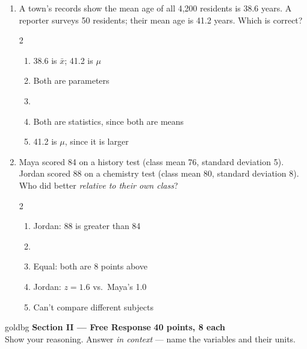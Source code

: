 \documentclass[12pt]{article}
\newenvironment{choices}
  {\begin{enumerate}[label=\textbf{(\Alph*)}, leftmargin=2.2em, itemsep=0pt, topsep=1pt]}
  {\end{enumerate}}
\newcommand{\letterroom}{\rule[-15pt]{0pt}{36pt}}
\begin{document}
\begin{enumerate}[leftmargin=1.9em, itemsep=0.03in]
  \boxguard[10]
  \item A town's records show the mean age of all 4,200 residents is 38.6 years. A reporter
        surveys 50 residents; their mean age is 41.2 years. Which is correct?
        \begin{multicols}{2}
        \begin{choices}
          \item 38.6 is $\bar x$; 41.2 is $\mu$
          \item Both are parameters
          \item {}
          \item Both are statistics, since both are means
          \item 41.2 is $\mu$, since it is larger
                \hfill{}\letterroom
        \end{choices}
        \end{multicols}

  \boxguard[11]
  \item Maya scored 84 on a history test (class mean 76, standard deviation 5). Jordan scored 88 on
        a chemistry test (class mean 80, standard deviation 8). Who did better \emph{relative to
        their own class}?\hfill{}\letterroom
        \begin{multicols}{2}
        \begin{choices}
          \item Jordan: 88 is greater than 84
          \item {}
          \item Equal: both are 8 points above
          \item Jordan: $z = 1.6$ vs.\ Maya's 1.0
          \item Can't compare different subjects
        \end{choices}
        \end{multicols}

\end{enumerate}

\vspace{0.08in}

\boxguard[12]
\begin{headlinebox}{goldbg}
\small
\textbf{Section II --- Free Response} \hfill \textbf{40 points, 8 each}\\
Show your reasoning. Answer \emph{in context} --- name the variables and their units.
\end{headlinebox}
\end{document}
